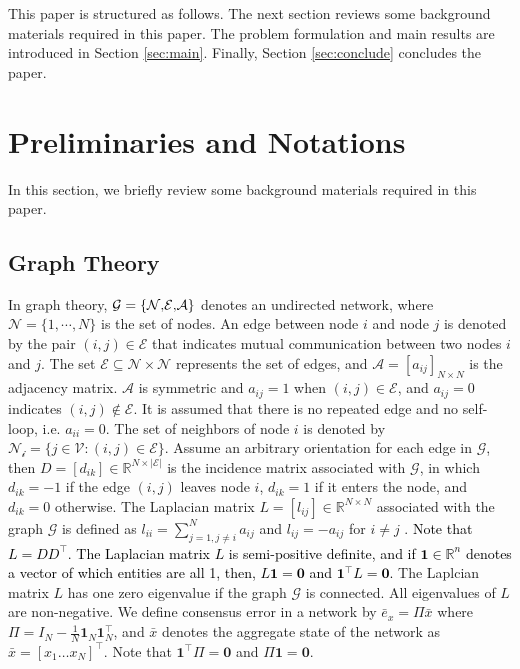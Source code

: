 \documentclass[letterpaper, 10 pt, conference]{ieeeconf}  %
\newcommand{\crb}{\color{black}}
\begin{document}
{{\crb
	 This paper is structured as follows. The next section reviews some background materials required in this paper. The problem formulation and main results are introduced in  Section \ref{sec:main}. Finally, Section \ref{sec:conclude} concludes the paper.
}




\section{Preliminaries and Notations}
{\crb In this section, we briefly review some background materials required in this paper.}

\subsection{Graph Theory}

In graph theory, $\mathcal{{G}=\left\{ \text{\ensuremath{\mathcal{N\text{,}E\text{,}A}}}\right\} }$
denotes an undirected network, where $\mathcal{{N}}=\{1,\cdots,N\}$
is the set of nodes. An edge between node $i$ and node $j$ is denoted by
the pair $(i,j)\in\mathcal{{E}}$ that indicates mutual communication
between two nodes $i$ and $j$. The set  $\mathcal{{E}}\subseteq\mathcal{N\times N}$
represents the set of edges, and $\mathcal{{A}=}[a_{ij}]_{N\times N}$
is the adjacency matrix. $\mathcal{{A}}$ is symmetric {\crb and}  $a_{ij}=1$
when $(i,j)\in\mathcal{{E}}$, and $a_{ij}=0$ indicates $(i,j)\notin\mathcal{{E}}$.
It is assumed that there is no repeated edge and no self-loop, i.e.
$a_{ii}=0$.  The set of neighbors of node $i$
is denoted by $\mathcal{{N_{\text{i}}}}=\{j\in\mathcal{{V}}:(i,j)\in\mathcal{{E}}\}$.
Assume an arbitrary orientation for each edge in $\mathcal{{G}}$,
then $D=[d_{ik}]\in\mathbb{{R}}^{N\times|\mathcal{{E}}|}$ is the
incidence matrix associated with $\mathcal{{G}}$, in which $d_{ik}=-1$
if the edge $(i,j)$ leaves node $i$, $d_{ik}=1$ if it enters the
node, and $d_{ik}=0$ otherwise. The Laplacian matrix $L=[l_{ij}]\in\mathcal{\mathbb{{R}}}^{N\times N}$
associated with the graph $\mathcal{{G}}$ is defined as $l_{ii}=\sum_{j=1,j\neq i}^{N}a_{ij}$
and $l_{ij}$$=-a_{ij}$ for $i\neq j$ . \textcolor{black}{Note that
	$L=DD^{\top}$. The Laplacian matrix $L$ is semi-positive {\crb definite, and  if} $\mathbf{1\in\mathbb{R}}^{n}$ denotes a vector of which entities
	are all 1, then, $L\mathbf{1}=\mathbf{0}$ and $\mathbf{1}^{\top}L=\mathbf{0}$. }{\crb The Laplcian matrix $L$ has one zero eigenvalue
	if the graph $\mathcal{{G}}$ is connected. All eigenvalues of $L$ are
	non-negative. We define consensus error in a network by $\bar{e}_{x}=\Pi\bar{x}$
	where $\Pi=I_{N}-\frac{1}{N}\mathbf{1}_{N}\mathbf{1}_{N}^{\top}$,
	and $\bar{x}$ denotes the aggregate state of the network as $\bar{x}=\left[x_{1}\ldots x_{N}\right]^{\top}$.
	Note that $\mathbf{1}^{\top}\Pi=\mathbf{0}$ and $\Pi\mathbf{1=0}$.\textcolor{black}{{} }}


}
\end{document}
